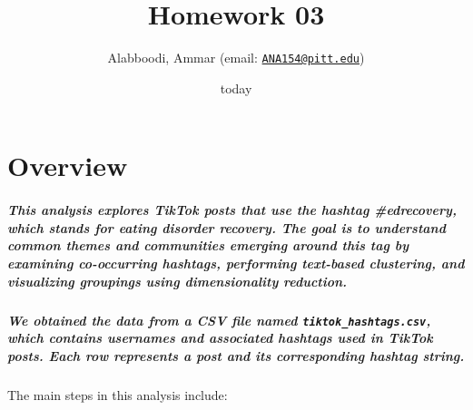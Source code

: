 \documentclass[
]{article}
\title{Homework 03}
\author{Alabboodi, Ammar (email:
\href{mailto:ANA154@pitt.edu}{\nolinkurl{ANA154@pitt.edu}})}
\date{today}
\begin{document}
\maketitle

{
\setcounter{tocdepth}{2}
\tableofcontents
}
\section{Overview}\label{overview}

\subparagraph{\texorpdfstring{This analysis explores TikTok posts that
use the hashtag \textbf{\#edrecovery}, which stands for \emph{eating
disorder recovery}. The goal is to understand common themes and
communities emerging around this tag by examining co-occurring hashtags,
performing text-based clustering, and visualizing groupings using
dimensionality
reduction.}{This analysis explores TikTok posts that use the hashtag \#edrecovery, which stands for eating disorder recovery. The goal is to understand common themes and communities emerging around this tag by examining co-occurring hashtags, performing text-based clustering, and visualizing groupings using dimensionality reduction.}}\label{this-analysis-explores-tiktok-posts-that-use-the-hashtag-edrecovery-which-stands-for-eating-disorder-recovery.-the-goal-is-to-understand-common-themes-and-communities-emerging-around-this-tag-by-examining-co-occurring-hashtags-performing-text-based-clustering-and-visualizing-groupings-using-dimensionality-reduction.}

\subparagraph{\texorpdfstring{We obtained the data from a CSV file named
\texttt{tiktok\_hashtags.csv}, which contains usernames and associated
hashtags used in TikTok posts. Each row represents a post and its
corresponding hashtag
string.}{We obtained the data from a CSV file named tiktok\_hashtags.csv, which contains usernames and associated hashtags used in TikTok posts. Each row represents a post and its corresponding hashtag string.}}\label{we-obtained-the-data-from-a-csv-file-named-tiktok_hashtags.csv-which-contains-usernames-and-associated-hashtags-used-in-tiktok-posts.-each-row-represents-a-post-and-its-corresponding-hashtag-string.}

The main steps in this analysis include:
\end{document}
